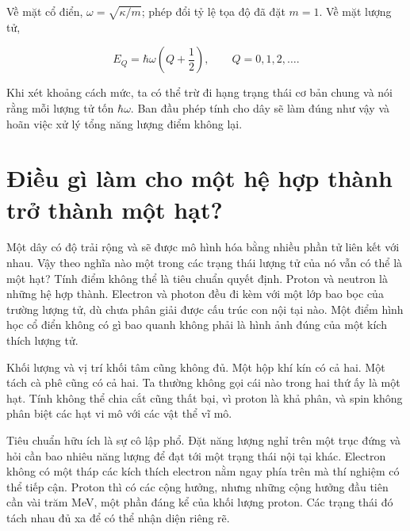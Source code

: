 Về mặt cổ điển, \(\omega=\sqrt{\kappa/m}\); phép đổi tỷ lệ tọa độ đã đặt \(m=1\). Về mặt lượng tử,

\begin{equation}
  E_Q=\hbar\omega\left(Q+\frac12\right),
  \qquad Q=0,1,2,\ldots .
  \label{eq:l02-oscillator-spectrum}
\end{equation}

Khi xét khoảng cách mức, ta có thể trừ đi hạng trạng thái cơ bản chung và nói rằng mỗi lượng tử tốn \(\hbar\omega\). Ban đầu phép tính cho dây sẽ làm đúng như vậy và hoãn việc xử lý tổng năng lượng điểm không lại.

\begin{classroomqa}
\end{classroomqa}

\section{Điều gì làm cho một hệ hợp thành trở thành một hạt?}

Một dây có độ trải rộng và sẽ được mô hình hóa bằng nhiều phần tử liên kết với nhau. Vậy theo nghĩa nào một trong các trạng thái lượng tử của nó vẫn có thể là một hạt? Tính điểm không thể là tiêu chuẩn quyết định. Proton và neutron là những hệ hợp thành. Electron và photon đều đi kèm với một lớp bao bọc của trường lượng tử, dù chưa phân giải được cấu trúc con nội tại nào. Một điểm hình học cổ điển không có gì bao quanh không phải là hình ảnh đúng của một kích thích lượng tử.

Khối lượng và vị trí khối tâm cũng không đủ. Một hộp khí kín có cả hai. Một tách cà phê cũng có cả hai. Ta thường không gọi cái nào trong hai thứ ấy là một hạt. Tính không thể chia cắt cũng thất bại, vì proton là khả phân, và spin không phân biệt các hạt vi mô với các vật thể vĩ mô.

Tiêu chuẩn hữu ích là sự cô lập phổ. Đặt năng lượng nghỉ trên một trục đứng và hỏi cần bao nhiêu năng lượng để đạt tới một trạng thái nội tại khác. Electron không có một tháp các kích thích electron nằm ngay phía trên mà thí nghiệm có thể tiếp cận. Proton thì có các cộng hưởng, nhưng những cộng hưởng đầu tiên cần vài trăm MeV, một phần đáng kể của khối lượng proton. Các trạng thái đó tách nhau đủ xa để có thể nhận diện riêng rẽ.

